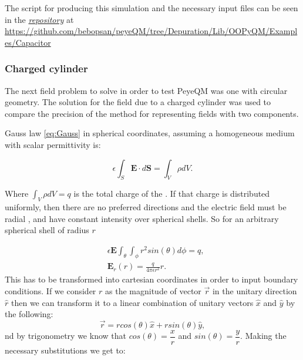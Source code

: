 The script for producing this simulation and the necessary input files can be seen in the 
\href{https://github.com/bebopsan/peyeQM/tree/Depuration/Lib/OOPyQM/Examples/Capacitor}{\textit{repository}} at \url{https://github.com/bebopsan/peyeQM/tree/Depuration/Lib/OOPyQM/Examples/Capacitor} 

\subsubsection{Charged cylinder}

The next field problem to solve in order to test PeyeQM was one with circular geometry. The solution for the field due to a  charged cylinder was used to compare the precision of the method for representing fields with two components.

Gauss law \ref{eq:Gauss} in spherical coordinates, assuming a homogeneous medium with scalar permittivity is:

\begin{equation}
\epsilon \int_S \mathbf{E}\cdot d\mathbf{S} = \int_V \rho dV.
\end{equation}

Where $\int_V \rho dV = q$ is the total charge of the . If that charge is distributed uniformly, then there are no preferred directions and the electric field must be radial \cite{Cheng1993}, and have constant intensity over spherical shells. So for an arbitrary spherical shell of radius $r$ 

\begin{align*}
&\epsilon \mathbf{E} \int_{\theta}\int_{\phi} r^2 sin(\theta) d \phi = q, \\
& \mathbf{E}_r(r) = \frac{q}{4\pi \epsilon r^2} \hat{r}.
\end{align*}
This has to be transformed into cartesian coordinates in order to input boundary conditions. If we consider $r$ as the magnitude of vector $\vec{r}$ in the unitary direction $\hat{r}$ then we can transform it to a linear combination of unitary vectors $\hat{x}$ and $\hat{y}$ by the following:
\begin{equation}
\vec{r} = r cos(\theta) \hat{x} + r sin(\theta) \hat{y},
\end{equation}
nd by trigonometry we know that $cos(\theta) =\dfrac{x}{r}$ and $sin(\theta)=\dfrac{y}{r}$. Making the necessary substitutions we get to:

